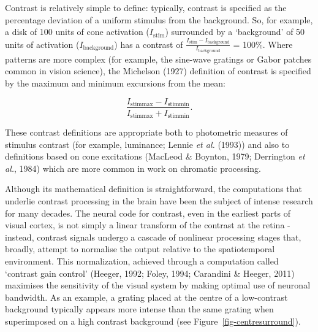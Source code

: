 \documentclass[
  letterpaper,
  DIV=11,
  numbers=noendperiod]{scrartcl}
\begin{document}
Contrast is relatively simple to define: typically, contrast is
specified as the percentage deviation of a uniform stimulus from the
background. So, for example, a disk of 100 units of cone activation
(\(I_{\mathrm{stim}}\)) surrounded by a `background' of 50 units of
activation (\(I_{\mathrm{background}}\)) has a contrast of
\(\frac{I_{\mathrm{stim}} - I_{\mathrm{background}}}{I_{\mathrm{background}}}\)
= 100\%. Where patterns are more complex (for example, the sine-wave
gratings or Gabor patches common in vision science), the Michelson
(1927) definition of contrast is specified by the maximum and minimum
excursions from the mean:

\begin{equation}
\frac {I_{\mathrm{stimmax} }-I_{\mathrm{stimmin} }}{I_{\mathrm{stimmax} }+I_{\mathrm{stimmin} }}.
\end{equation}

These contrast definitions are appropriate both to photometric measures
of stimulus contrast (for example, luminance; Lennie \emph{et al.}
(1993)) and also to definitions based on cone excitations (MacLeod \&
Boynton, 1979; Derrington \emph{et al.}, 1984) which are more common in
work on chromatic processing.

Although its mathematical definition is straightforward, the
computations that underlie contrast processing in the brain have been
the subject of intense research for many decades. The neural code for
contrast, even in the earliest parts of visual cortex, is not simply a
linear transform of the contrast at the retina - instead, contrast
signals undergo a cascade of nonlinear processing stages that, broadly,
attempt to normalise the output relative to the spatiotemporal
environment. This normalization, achieved through a computation called
`contrast gain control' (Heeger, 1992; Foley, 1994; Carandini \& Heeger,
2011) maximises the sensitivity of the visual system by making optimal
use of neuronal bandwidth. As an example, a grating placed at the centre
of a low-contrast background typically appears more intense than the
same grating when superimposed on a high contrast background (see
Figure~\ref{fig-centresurround}).
\end{document}
